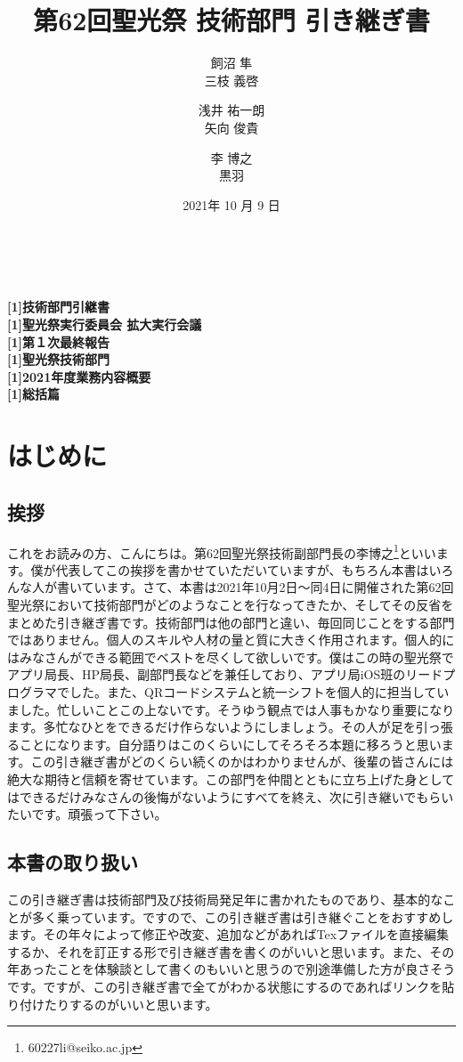 \documentclass[dvipdfmx,11pt]{jarticle}
\title{第62回聖光祭 技術部門 引き継ぎ書}
\author{飼沼 隼 \\ 三枝 義啓 \and 浅井 祐一朗 \\ 矢向 俊貴 \and 李 博之 \\ 黒羽 }
\date{2021年 10 月 9 日}
\begin{document}
\begin{center}

\textbf {
\vspace{8.5cm}
\\
\Ovalbox{\fontsize{33pt}{20pt}\selectfont \scalebox{1.05}[1]{超機密}}\\
\fontsize{50pt}{60pt}\selectfont \scalebox{1.05}[1]{技術部門引継書}\\
\fontsize{12pt}{30pt}\selectfont \scalebox{1.05}[1]{聖光祭実行委員会 拡大実行会議}\\
\fontsize{35pt}{35pt}\selectfont \scalebox{1.05}[1]{第１次最終報告}\\
\fontsize{12pt}{25pt}\selectfont \scalebox{1.05}[1]{聖光祭技術部門}\\
\fontsize{12pt}{15pt}\selectfont \scalebox{1.05}[1]{2021年度業務内容概要}\\
\fontsize{12pt}{20pt}\selectfont \scalebox{1.05}[1]{総括篇}\\
}
\end{center}
\pagebreak
\tableofcontents
\clearpage
\section{はじめに}
\subsection{挨拶}
これをお読みの方、こんにちは。第62回聖光祭技術副部門長の李博之\footnote{60227li@seiko.ac.jp}といいます。僕が代表してこの挨拶を書かせていただいていますが、もちろん本書はいろんな人が書いています。さて、本書は2021年10月2日〜同4日に開催された第62回聖光祭において技術部門がどのようなことを行なってきたか、そしてその反省をまとめた引き継ぎ書です。技術部門は他の部門と違い、毎回同じことをする部門ではありません。個人のスキルや人材の量と質に大きく作用されます。個人的にはみなさんができる範囲でベストを尽くして欲しいです。僕はこの時の聖光祭でアプリ局長、HP局長、副部門長などを兼任しており、アプリ局iOS班のリードプログラマでした。また、QRコードシステムと統一シフトを個人的に担当していました。忙しいことこの上ないです。そうゆう観点では人事もかなり重要になります。多忙なひとをできるだけ作らないようにしましょう。その人が足を引っ張ることになります。自分語りはこのくらいにしてそろそろ本題に移ろうと思います。この引き継ぎ書がどのくらい続くのかはわかりませんが、後輩の皆さんには絶大な期待と信頼を寄せています。この部門を仲間とともに立ち上げた身としてはできるだけみなさんの後悔がないようにすべてを終え、次に引き継いでもらいたいです。頑張って下さい。
\subsection{本書の取り扱い}
この引き継ぎ書は技術部門及び技術局発足年に書かれたものであり、基本的なことが多く乗っています。ですので、この引き継ぎ書は引き継ぐことをおすすめします。その年々によって修正や改変、追加などがあればTexファイルを直接編集するか、それを訂正する形で引き継ぎ書を書くのがいいと思います。また、その年あったことを体験談として書くのもいいと思うので別途準備した方が良さそうです。ですが、この引き継ぎ書で全てがわかる状態にするのであればリンクを貼り付けたりするのがいいと思います。
\end{document}
